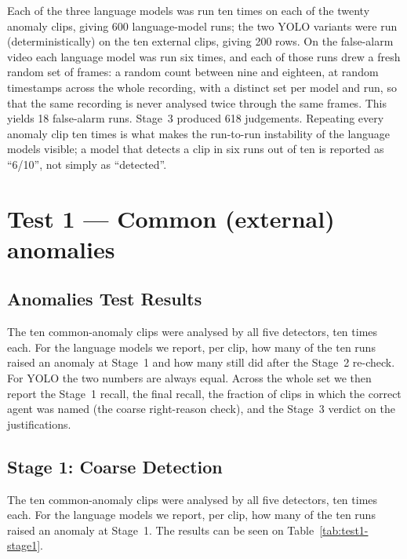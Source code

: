 \documentclass[11pt,a4paper]{article}
\begin{document}
Each of the three language models was run ten times on each of the twenty
anomaly clips, giving 600 language-model runs; the two YOLO variants were
run (deterministically) on the ten external clips, giving 200 rows. On the
false-alarm video each language model was run six times, and each of those
runs drew a fresh random set of frames: a random count between nine and
eighteen, at random timestamps across the whole recording, with a distinct
set per model and run, so that the same recording is never analysed twice
through the same frames. This yields 18 false-alarm runs. Stage~3 produced
618 judgements. Repeating every anomaly clip ten times is what makes the
run-to-run instability of the language models visible; a model that
detects a clip in six runs out of ten is reported as ``6/10'', not simply
as ``detected''.

\section{Test 1 --- Common (external) anomalies}
\label{sec:test1}

\subsection{Anomalies Test Results}

The ten common-anomaly clips were analysed by all five detectors, ten
times each. For the language models we report, per clip, how many of the
ten runs raised an anomaly at Stage~1 and how many still did after the
Stage~2 re-check. For YOLO the two numbers are always equal. Across the
whole set we then report the Stage~1 recall, the final recall, the
fraction of clips in which the correct agent was named (the coarse
right-reason check), and the Stage~3 verdict on the justifications.

\subsection{Stage 1: Coarse Detection}

The ten common-anomaly clips were analysed by all five detectors, ten
times each. For the language models we report, per clip, how many of the
ten runs raised an anomaly at Stage~1. The results can be seen on
Table~\ref{tab:test1-stage1}.
\end{document}
